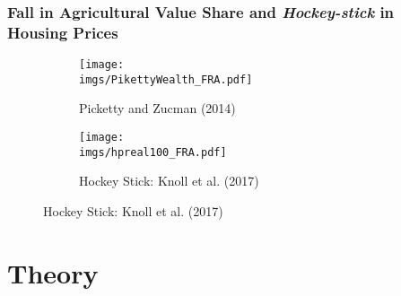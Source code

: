 \documentclass[aspectratio=169]{beamer}
\begin{document}
\begin{frame}
\frametitle{Fall in Agricultural Value Share and \emph{Hockey-stick} in Housing Prices}

\begin{figure}
    \centering
	\begin{subfigure}[t]{0.49\textwidth}
        \centering
        \texttt{[image: \\imgs/PikettyWealth\_FRA.pdf]}
        \caption{Picketty and Zucman (2014)}
        \label{fig:sub2}
    \end{subfigure}
    \begin{subfigure}[t]{0.49\textwidth}
        \centering
        \texttt{[image: \\imgs/hpreal100\_FRA.pdf]}
        \caption{Hockey Stick: Knoll et al. (2017)}
        \label{fig:sub1}
    \end{subfigure}\hskip 1mm%

\end{figure}


\end{frame}



\section{Theory}
\end{document}
